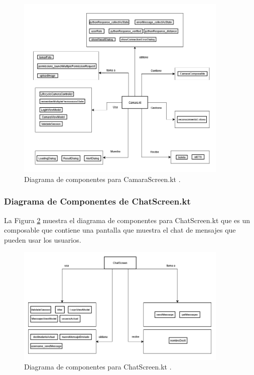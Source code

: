 \begin{figure}[htbp!]
	\begin{center}
		\includegraphics[width=0.9\textwidth]{DiagramasMoviles/DCM (14)}
		\caption{Diagrama de componentes para CamaraScreen.kt .}
		\label{fig:Componentes_2}
	\end{center}
\end{figure}

\newpage

\subsubsection{Diagrama de Componentes de ChatScreen.kt}

La Figura \ref{fig:Componentes_3} muestra el diagrama de componentes para ChatScreen.kt que es un composable que contiene una pantalla que muestra el chat de mensajes que pueden usar los usuarios.

\begin{figure}[htbp!]
	\begin{center}
		\includegraphics[width=0.9\textwidth]{DiagramasMoviles/DCM (15)}
		\caption{Diagrama de componentes para ChatScreen.kt .}
		\label{fig:Componentes_3}
	\end{center}
\end{figure}

